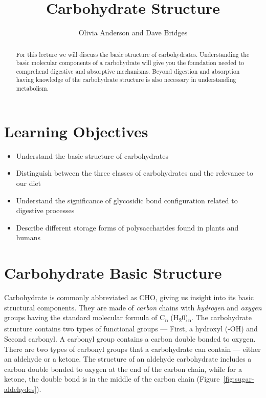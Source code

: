 \documentclass{tufte-handout}
\title{Carbohydrate Structure}
\author{Olivia Anderson and Dave Bridges}
\date{}  %
\begin{document}
\maketitle%

\begin{abstract}
For this lecture we will discuss the basic structure of carbohydrates. Understanding the basic molecular components of a carbohydrate will give you the foundation needed to comprehend digestive and absorptive mechanisms. Beyond digestion and absorption having knowledge of the carbohydrate structure is also necessary in understanding metabolism. 
\end{abstract}

\tableofcontents


\pagebreak

\section{Learning Objectives}

\begin{itemize}
\item Understand the basic structure of carbohydrates
\item Distinguish between the three classes of carbohydrates and the relevance to our diet
\item Understand the significance of glycosidic bond configuration related to digestive processes
\item Describe different storage forms of polysaccharides found in plants and humans
\end{itemize}

\section{Carbohydrate Basic Structure}\label{carbohydrate-basic-structure}
Carbohydrate is commonly abbreviated as CHO, giving us insight into its basic structural components. They are made of \emph{carbon} chains with \emph{hydrogen} and \emph{oxygen} groups having the standard molecular formula of C\textsubscript{n} (H\textsubscript{2}0)\textsubscript{n}. The carbohydrate structure contains two types of functional groups --- First, a hydroxyl (-OH) and Second carbonyl. A carbonyl group contains a carbon double bonded to oxygen. There are two types of carbonyl groups that a carbohydrate can contain --- either an aldehyde or a ketone. The structure of an aldehyde carbohydrate includes a carbon double bonded to oxygen at the end of the carbon chain, while for a ketone, the double bond is in the middle of the carbon chain (Figure~\ref{fig:sugar-aldehydes}).
\end{document}
